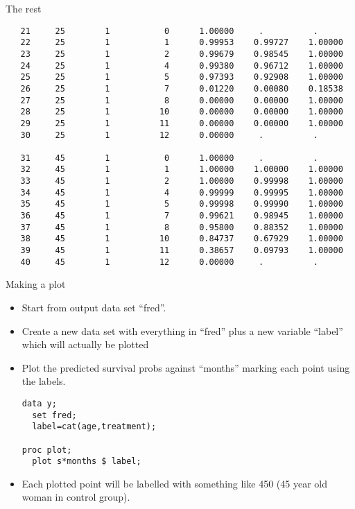\documentclass[pdf]{prosper}
\begin{document}
\begin{slide}{The rest}

{\scriptsize
\begin{verbatim}
   21     25        1           0      1.00000     .          .     
   22     25        1           1      0.99953    0.99727    1.00000
   23     25        1           2      0.99679    0.98545    1.00000
   24     25        1           4      0.99380    0.96712    1.00000
   25     25        1           5      0.97393    0.92908    1.00000
   26     25        1           7      0.01220    0.00080    0.18538
   27     25        1           8      0.00000    0.00000    1.00000
   28     25        1          10      0.00000    0.00000    1.00000
   29     25        1          11      0.00000    0.00000    1.00000
   30     25        1          12      0.00000     .          .     

   31     45        1           0      1.00000     .          .     
   32     45        1           1      1.00000    1.00000    1.00000
   33     45        1           2      1.00000    0.99998    1.00000
   34     45        1           4      0.99999    0.99995    1.00000
   35     45        1           5      0.99998    0.99990    1.00000
   36     45        1           7      0.99621    0.98945    1.00000
   37     45        1           8      0.95800    0.88352    1.00000
   38     45        1          10      0.84737    0.67929    1.00000
   39     45        1          11      0.38657    0.09793    1.00000
   40     45        1          12      0.00000     .          .     

\end{verbatim}
}
  
\end{slide}

\begin{slide}{Making a plot}

  \begin{itemize}
  \item Start from output data set ``fred''.
  \item Create a new data set with everything in ``fred'' plus a new variable ``label'' which will actually be plotted
  \item Plot the predicted survival probs against ``months'' marking each point using the labels.

\begin{verbatim}
data y;
  set fred;
  label=cat(age,treatment);

proc plot;
  plot s*months $ label;
\end{verbatim}
    \item Each plotted point will be labelled with something like 450 (45 year old woman in control group).
  \end{itemize}
  
\end{slide}
\end{document}
